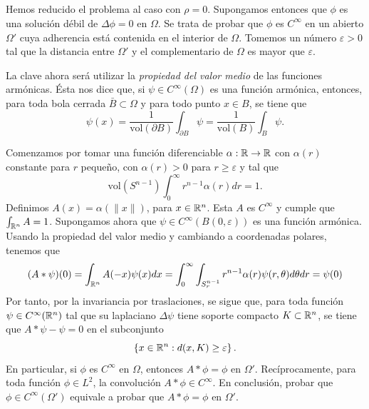 \documentclass[11pt,a4paper]{amsbook}
\theoremstyle{remark} \newtheorem{rmk}[subsection]{Observación}
\theoremstyle{definition} \newtheorem{defn}[subsection]{Definición}
\theoremstyle{definition} \newtheorem{ex}[subsection]{Ejemplo}
\theoremstyle{definition} \newtheorem{ej}[subsection]{Ejercicio}
\begin{document}
\subsection{} Hemos reducido el problema al caso con $\rho=0$. Supongamos entonces que $\phi$ es una solución débil de $\Delta \phi = 0$ en $\Omega$. Se trata de probar que $\phi$ es $C^\infty$ en un abierto $\Omega'$ cuya adherencia está contenida en el interior de $\Omega$. Tomemos un número $\varepsilon >0$ tal que la distancia entre $\Omega'$ y el complementario de $\Omega$ es mayor que $\varepsilon$.

La clave ahora será utilizar la \emph{propiedad del valor medio} de las funciones armónicas. Ésta nos dice que, si $\psi \in C^\infty(\Omega)$ es una función armónica, entonces, para toda bola cerrada $\bar{B}\subset \Omega$ y para todo punto $x\in B$, se tiene que
\begin{equation*}
\psi(x) =\frac{1}{\mathrm{vol}(\partial B)} \int_{\partial B} \psi = \frac{1}{\mathrm{vol}(B)} \int_B \psi.
\end{equation*}

Comenzamos por tomar una función diferenciable $\alpha:\mathbb R\rightarrow \mathbb R$ con $\alpha(r)$ constante para $r$ pequeño, con $\alpha(r)>0$ para $r\geq \varepsilon$ y tal que
\begin{equation*}
\mathrm{vol}(S^{n-1}) \int_0^\infty r^{n-1} \alpha(r) dr = 1.
\end{equation*}
Definimos $A(x)=\alpha(\lVert x \rVert)$, para $x\in \mathbb R^n$. Esta $A$ es $C^\infty$ y cumple que $\int_{\mathbb R^n} A = 1$. Supongamos ahora que $\psi\in C^\infty(B(0,\varepsilon))$ es una función armónica. Usando la propiedad del valor medio y cambiando a coordenadas polares, tenemos que
\begin{equation*}
(A*\psi)(0) = \int_{\mathbb R^n} A(-x) \psi(x) dx = \int_0^\infty \int_{S^{n-1}_r} r^{n-1} \alpha(r) \psi(r,\theta) d\theta dr = \psi(0)
\end{equation*}
Por tanto, por la invariancia por traslaciones, se sigue que, para toda función $\psi \in C^\infty(\mathbb R^n)$ tal que su laplaciano $\Delta\psi$ tiene soporte compacto $K\subset \mathbb R^n$, se tiene que $A*\psi - \psi = 0$ en el subconjunto
\begin{equation*}
\left\{ x \in \mathbb R^n: d(x,K) \geq \varepsilon  \right\}.
\end{equation*}
En particular, si $\phi$ es $C^\infty$ en $\Omega$, entonces $A*\phi = \phi$ en $\Omega'$. Recíprocamente, para toda función $\phi \in L^2$, la convolución $A* \phi \in C^\infty$. En conclusión, probar que $\phi \in C^\infty(\Omega')$ equivale a probar que $A*\phi = \phi$ en $\Omega'$.
\end{document}
